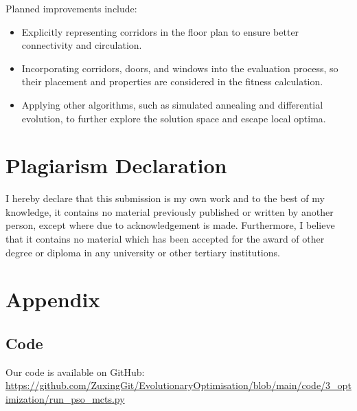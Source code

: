 \documentclass[]{article}
\begin{document}
Planned improvements include:
\begin{itemize}
    \item Explicitly representing corridors in the floor plan to ensure better connectivity and circulation.
    \item Incorporating corridors, doors, and windows into the evaluation process, so their placement and properties are considered in the fitness calculation.
    \item Applying other algorithms, such as simulated annealing and differential evolution, to further explore the solution space and escape local optima.
\end{itemize}


\section{Plagiarism Declaration}
I hereby declare that this submission is my own work and to the best of my knowledge, it contains no material previously published or written by another person, except where due to acknowledgement is made. Furthermore, I believe that it contains no material which has been accepted for the award of other degree or diploma in any university or other tertiary institutions.




\appendix
\section{Appendix}
\subsection{Code}
Our code is available on GitHub: \url{https://github.com/ZuxingGit/EvolutionaryOptimisation/blob/main/code/3_optimization/run_pso_mcts.py}
\end{document}
